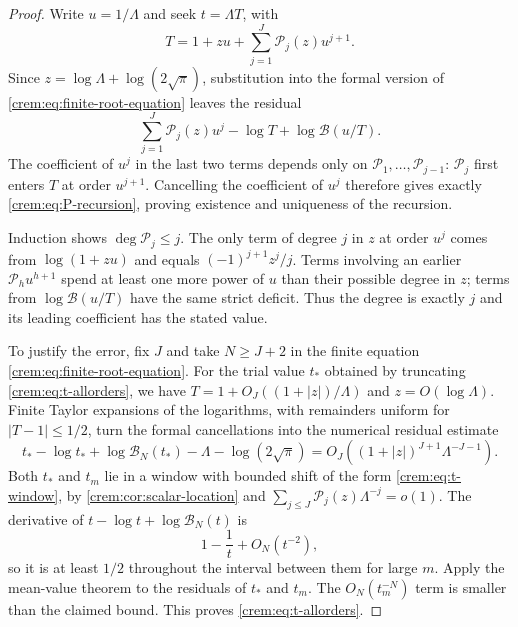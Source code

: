 \documentclass[11pt,a4paper]{article}
\theoremstyle{definition}\newaliascnt{definition}{theorem}
\theoremstyle{remark}\newaliascnt{remark}{theorem}
\newcommand{\Bformal}{\mathcal B}%
\begin{document}
\begin{proof}
Write $u=1/\Lambda$ and seek $t=\Lambda T$, with
\[
 T=1+zu+\sum_{j=1}^{J}\mathcal P_j(z)u^{j+1}.
\]
Since $z=\log\Lambda+\log(2\sqrt\pi)$, substitution into the formal version
of \eqref{crem:eq:finite-root-equation} leaves the residual
\begin{equation}
 \sum_{j=1}^{J}\mathcal P_j(z)u^j-\log T
       +\log\Bformal(u/T).
 \label{crem:eq:formal-residual}
\end{equation}
The coefficient of $u^j$ in the last two terms depends only on
$\mathcal P_1,\ldots,\mathcal P_{j-1}$: $\mathcal P_j$ first enters $T$ at
order $u^{j+1}$. Cancelling the coefficient of $u^j$ therefore gives exactly
\eqref{crem:eq:P-recursion}, proving existence and uniqueness of the
recursion.

Induction shows $\deg\mathcal P_j\le j$. The only term of degree $j$ in $z$
at order $u^j$ comes from $\log(1+zu)$ and equals $(-1)^{j+1}z^j/j$. Terms
involving an earlier $\mathcal P_hu^{h+1}$ spend at least one more power of
$u$ than their possible degree in $z$; terms from $\log\Bformal(u/T)$ have
the same strict deficit. Thus the degree is exactly $j$ and its leading
coefficient has the stated value.

To justify the error, fix $J$ and take $N\ge J+2$ in the finite equation
\eqref{crem:eq:finite-root-equation}. For the trial value $t_*$ obtained by
truncating \eqref{crem:eq:t-allorders}, we have
$T=1+O_J((1+|z|)/\Lambda)$ and $z=O(\log\Lambda)$. Finite Taylor expansions
of the logarithms, with remainders uniform for $|T-1|\le1/2$, turn the formal
cancellations into the numerical residual estimate
\[
 t_*-\log t_*+\log\Bformal_N(t_*)-\Lambda-\log(2\sqrt\pi)
 =O_J((1+|z|)^{J+1}\Lambda^{-J-1}).
\]
Both $t_*$ and $t_m$ lie in a window with bounded shift of the form
\eqref{crem:eq:t-window}, by \cref{crem:cor:scalar-location} and
$\sum_{j\le J}\mathcal P_j(z)\Lambda^{-j}=o(1)$. The derivative of
$t-\log t+\log\Bformal_N(t)$ is
\[
 1-\frac1t+O_N(t^{-2}),
\]
so it is at least $1/2$ throughout the interval between them for large $m$.
Apply the mean-value theorem to the residuals of $t_*$ and $t_m$. The
$O_N(t_m^{-N})$ term is smaller than the claimed bound. This proves
\eqref{crem:eq:t-allorders}.
\end{proof}
\end{document}
